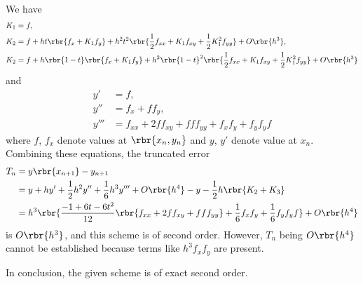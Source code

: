 \documentclass[english, nochinese]{pkupaper}
\title{\titlemark}
\author{\authoring}
\begin{document}
\maketitle

\begin{thmquestion}
\ 
\begin{thmproof}
We have
\begin{align}
K_1 &= f, \\
K_2 &= f + h t \rbr{ f_x + K_1 f_y } + h^2 t^2 \rbr{ \frac{1}{2} f_{ x x } + K_1 f_{ x y } + \frac{1}{2} K_1^2 f_{ y y } } + O \rbr{h^3}, \\
K_2 &= f + h \rbr{ 1 - t } \rbr{ f_x + K_1 f_y } + h^2 \rbr{ 1 - t }^2 \rbr{ \frac{1}{2} f_{ x x } + K_1 f_{ x y } + \frac{1}{2} K_1^2 f_{ y y } } + O \rbr{h^3}
\end{align}
and
\begin{align}
y' &= f, \\
y'' &= f_x + f f_y, \\
y''' &= f_{ x x } + 2 f f_{ x y } + f f f_{ y y } + f_x f_y + f_y f_y f
\end{align}
where $f$, $f_x$ denote values at $ \rbr{ x_n, y_n } $ and $y$, $y'$ denote value at $x_n$. Combining these equations, the truncated error
\begin{equation}
\begin{split}
T_n &= y \rbr{x_{ n + 1 }} - y_{ n + 1 } \\
&= y + h y' + \frac{1}{2} h^2 y'' + \frac{1}{6} h^3 y''' + O \rbr{h^4} - y - \frac{1}{2} h \rbr{ K_2 + K_3 } \\
&= h^3 \rbr{ \frac{ -1 + 6 t - 6 t^2 }{12} \rbr{ f_{ x x } + 2 f f_{ x y } + f f f_{ y y } } + \frac{1}{6} f_x f_y + \frac{1}{6} f_y f_y f } + O \rbr{h^4}
\end{split}
\end{equation}
is $ O \rbr{h^3} $, and this scheme is of second order. However, $T_n$ being $ O \rbr{h^4} $ cannot be established because terms like $ h^3 f_x f_y $ are present.

In conclusion, the given scheme is of exact second order.

\sqed
\end{thmproof}
\end{thmquestion}
\end{document}
